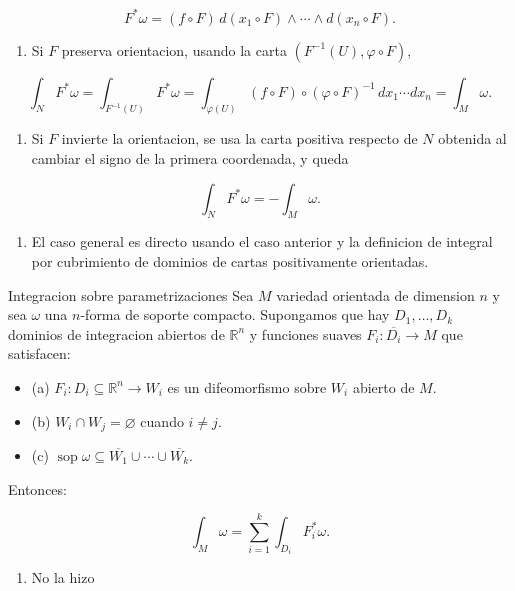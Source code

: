 \begin{bookproof}{}
\[
F^*\omega=(f\circ F)\,d(x_1\circ F)\wedge\cdots\wedge d(x_n\circ F).
\]
\begin{enumerate}[start=3]
\item Si $F$ preserva orientacion, usando la carta $(F^{-1}(U),\varphi\circ F)$,
\end{enumerate}
\[
\int_NF^*\omega=\int_{F^{-1}(U)}F^*\omega=\int_{\varphi(U)}(f\circ F)\circ(\varphi\circ F)^{-1}\,dx_1\cdots dx_n=\int_M\omega.
\]
\begin{enumerate}[start=4]
\item Si $F$ invierte la orientacion, se usa la carta positiva respecto de $N$ obtenida al cambiar el signo de la primera coordenada, y queda
\end{enumerate}
\[
\int_NF^*\omega=-\int_M\omega.
\]
\begin{enumerate}[start=5]
\item El caso general es directo usando el caso anterior y la definicion de integral por cubrimiento de dominios de cartas positivamente orientadas.
\end{enumerate}
\bookqed
\end{bookproof}
\begin{bookproposition}{Integracion sobre parametrizaciones}
Sea $M$ variedad orientada de dimension $n$ y sea $\omega$ una $n$-forma de soporte compacto. Supongamos que hay $D_1,\ldots,D_k$ dominios de integracion abiertos de $\mathbb R^n$ y funciones suaves $F_i:\overline{D_i}\to M$ que satisfacen:

\begin{itemize}
\item (a) $F_i:D_i\subseteq\mathbb R^n\to W_i$ es un difeomorfismo sobre $W_i$ abierto de $M$.
\item (b) $W_i\cap W_j=\varnothing$ cuando $i\neq j$.
\item (c) $\operatorname{sop}\omega\subseteq\overline{W_1}\cup\cdots\cup\overline{W_k}$.
\end{itemize}
Entonces:

\[
\int_M\omega=\sum_{i=1}^k\int_{D_i}F_i^*\omega.
\]
\end{bookproposition}
\begin{bookproof}{}
\begin{enumerate}
\item No la hizo
\end{enumerate}
\bookqed
\end{bookproof}
